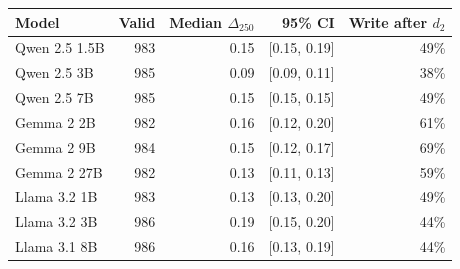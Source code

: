 \begin{tabularx}{\linewidth}{@{}lrrrr@{}}
\toprule
\textbf{Model} & \textbf{Valid} & \textbf{Median $\Delta_{250}$} & \textbf{95\% CI} & \textbf{Write after $d_2$} \\
\midrule
Qwen 2.5 1.5B & 983 & 0.15 & [0.15, 0.19] & 49\% \\
Qwen 2.5 3B & 985 & 0.09 & [0.09, 0.11] & 38\% \\
Qwen 2.5 7B & 985 & 0.15 & [0.15, 0.15] & 49\% \\
Gemma 2 2B & 982 & 0.16 & [0.12, 0.20] & 61\% \\
Gemma 2 9B & 984 & 0.15 & [0.12, 0.17] & 69\% \\
Gemma 2 27B & 982 & 0.13 & [0.11, 0.13] & 59\% \\
Llama 3.2 1B & 983 & 0.13 & [0.13, 0.20] & 49\% \\
Llama 3.2 3B & 986 & 0.19 & [0.15, 0.20] & 44\% \\
Llama 3.1 8B & 986 & 0.16 & [0.13, 0.19] & 44\% \\
\bottomrule
\end{tabularx}
